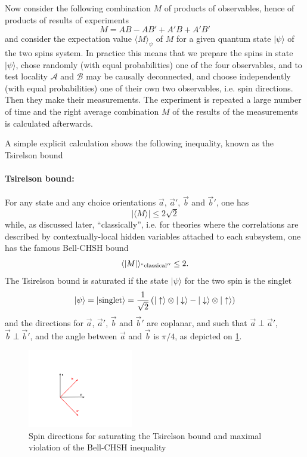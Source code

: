 Now consider the following combination $M$ of products of observables, hence of products of results of experiments
\begin{equation}
\label{McorBHSH}
M=AB-A B' + A' B + A' B'
\end{equation}
and consider the expectation value $\langle M\rangle_\psi$ of $M$ for a given quantum state $|\psi\rangle$ of the two spins system.
In practice this means that we prepare the spins in state  $|\psi\rangle$, chose randomly (with equal probabilities) one of the four observables, and to test locality $\mathcal{A}$ and $\mathcal{B}$ may be causally deconnected, and choose independently (with equal probabilities) one of their own two observables, i.e. spin directions. Then they make their measurements. The experiment is repeated a large number of time  and the right average combination $M$ of the results of the measurements is calculated afterwards.

A simple explicit calculation shows the following inequality, known as the Tsirelson bound \cite{springerlink:10.1007/BF00417500}

\paragraph{Tsirelson bound:}
For any state and any choice orientations $\vec a$, $\vec a'$, $\vec b$ and $\vec b'$, one has
\begin{equation}
\label{TsirBound}
|\langle M\rangle |\le 2\sqrt{2}
\end{equation}
while, as discussed later, ``classically'', i.e. for theories where the correlations are described by contextually-local hidden variables attached to each subsystem, one has the famous Bell-CHSH bound 
\begin{equation}
\label{ }
\langle|M|\rangle_\mathrm{``classical''}\le 2.
\end{equation}
The Tsirelson bound is saturated if the state $|\psi\rangle$ for the two spin is the singlet
\begin{equation}
\label{ }
|\psi\rangle=|\text{singlet}\rangle={1\over \sqrt{2}}\left(  |\uparrow\rangle\otimes | \downarrow\rangle - |\downarrow\rangle\otimes | \uparrow\rangle \right)
\end{equation}
and the directions for  $\vec a$, $\vec a'$, $\vec b$ and $\vec b'$ are coplanar, and such that $\vec a\perp\vec a'$, $\vec b\perp\vec b'$, and the angle between $\vec a$ and $\vec b$ is $\pi/4$, as depicted on \ref{figBCHSH}.
\begin{figure}[h]
\begin{center}
\includegraphics[width=1.8in]{Bchsh.pdf}
\caption{Spin directions for saturating the Tsirelson bound and maximal violation of the Bell-CHSH inequality}
\label{figBCHSH}
\end{center}
\end{figure}

